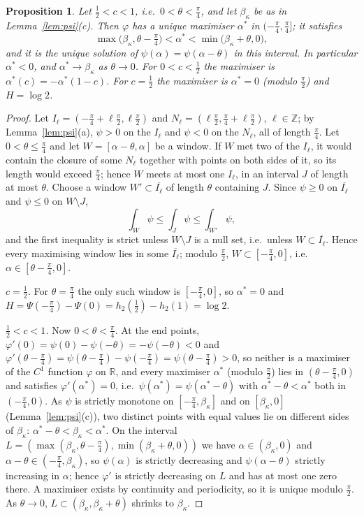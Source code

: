 \documentclass[11pt]{article}
\newcommand{\R}{\mathbb{R}}
\newcommand{\Z}{\mathbb{Z}}
\theoremstyle{plain}
\newtheorem{proposition}[theorem]{Proposition}
\theoremstyle{definition}
\theoremstyle{remark}
\begin{document}
\begin{proposition}\label{prop:angle}
Let $\frac12<c<1$, i.e.\ $0<\theta<\frac\pi4$, and let $\beta_\kappa$ be as in Lemma~\ref{lem:psi}(c). Then $\varphi$ has a unique
maximiser $\alpha^*$ in $(-\frac\pi4,\frac\pi4]$; it satisfies
\[
  \max\bigl(\beta_\kappa,\theta-\tfrac\pi4\bigr)<\alpha^*<\min\bigl(\beta_\kappa+\theta,0\bigr),
\]
and it is the unique solution of $\psi(\alpha)=\psi(\alpha-\theta)$ in this interval. In particular $\alpha^*<0$, and
$\alpha^*\to\beta_\kappa$ as $\theta\to0$. For $0<c<\frac12$ the maximiser is $\alpha^*(c)=-\alpha^*(1-c)$. For $c=\frac12$ the
maximiser is $\alpha^*=0$ (modulo $\frac\pi2$) and $H=\log2$.
\end{proposition}
\begin{proof}
Let $I_\ell=(-\frac\pi4+\ell\frac\pi2,\ell\frac\pi2)$ and $N_\ell=(\ell\frac\pi2,\frac\pi4+\ell\frac\pi2)$, $\ell\in\Z$; by Lemma~\ref{lem:psi}(a),
$\psi>0$ on the $I_\ell$ and $\psi<0$ on the $N_\ell$, all of length $\frac\pi4$. Let $0<\theta\le\frac\pi4$ and let
$W=[\alpha-\theta,\alpha]$ be a window. If $W$ met two of the $I_\ell$, it would contain the closure of some $N_\ell$ together with
points on both sides of it, so its length would exceed $\frac\pi4$; hence $W$ meets at most one $I_\ell$, in an interval $J$ of
length at most $\theta$. Choose a window $W'\subset\overline{I_\ell}$ of length $\theta$ containing $J$. Since $\psi\ge0$ on
$\overline{I_\ell}$ and $\psi\le0$ on $W\setminus J$,
\[
  \int_W\psi\le\int_J\psi\le\int_{W'}\psi,
\]
and the first inequality is strict unless $W\setminus J$ is a null set, i.e.\ unless $W\subset\overline{I_\ell}$. Hence every
maximising window lies in some $\overline{I_\ell}$; modulo $\frac\pi2$, $W\subset[-\frac\pi4,0]$, i.e.\ $\alpha\in[\theta-\frac\pi4,0]$.

\emph{$c=\frac12$.} For $\theta=\frac\pi4$ the only such window is $[-\frac\pi4,0]$, so $\alpha^*=0$ and
$H=\Psi(-\frac\pi4)-\Psi(0)=h_2(\frac12)-h_2(1)=\log2$.

\emph{$\frac12<c<1$.} Now $0<\theta<\frac\pi4$. At the end points, $\varphi'(0)=\psi(0)-\psi(-\theta)=-\psi(-\theta)<0$ and
$\varphi'(\theta-\frac\pi4)=\psi(\theta-\frac\pi4)-\psi(-\frac\pi4)=\psi(\theta-\frac\pi4)>0$, so neither is a maximiser of the
$C^1$ function $\varphi$ on $\R$, and every maximiser $\alpha^*$ (modulo $\frac\pi2$) lies in $(\theta-\frac\pi4,0)$ and satisfies
$\varphi'(\alpha^*)=0$, i.e.\ $\psi(\alpha^*)=\psi(\alpha^*-\theta)$ with $\alpha^*-\theta<\alpha^*$ both in $(-\frac\pi4,0)$. As $\psi$ is
strictly monotone on $[-\frac\pi4,\beta_\kappa]$ and on $[\beta_\kappa,0]$ (Lemma~\ref{lem:psi}(c)), two distinct points with equal
values lie on different sides of $\beta_\kappa$: $\alpha^*-\theta<\beta_\kappa<\alpha^*$. On the interval
$L=(\max(\beta_\kappa,\theta-\frac\pi4),\min(\beta_\kappa+\theta,0))$ we have $\alpha\in(\beta_\kappa,0)$ and
$\alpha-\theta\in(-\frac\pi4,\beta_\kappa)$, so $\psi(\alpha)$ is strictly decreasing and $\psi(\alpha-\theta)$ strictly increasing
in $\alpha$; hence $\varphi'$ is strictly decreasing on $L$ and has at most one zero there. A maximiser exists by continuity and
periodicity, so it is unique modulo $\frac\pi2$. As $\theta\to0$, $L\subset(\beta_\kappa,\beta_\kappa+\theta)$ shrinks to $\beta_\kappa$.


\end{proof}
\end{document}
